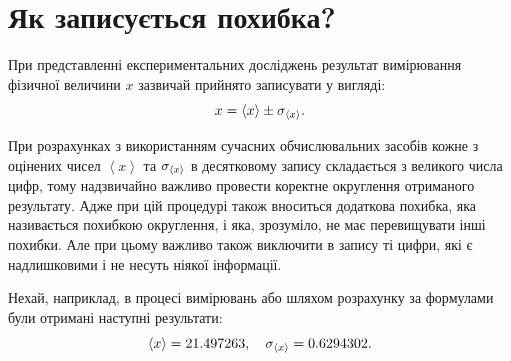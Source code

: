 \documentclass{LabBook}
\begin{document}

  \chapter{Як записується похибка?}


  При представленні експериментальних досліджень результат вимірювання фізичної величини $x$ зазвичай прийнято записувати у вигляді:
  \begin{equation}\label{eq:result}
    x = \left\langle x \right\rangle \pm \sigma_{\left\langle x \right\rangle}.
  \end{equation}

  При розрахунках з використанням сучасних обчислювальних засобів кожне з оцінених чисел $\left\langle x \right\rangle$ та $\sigma_{\left\langle x \right\rangle}$ в десятковому запису складається з великого числа цифр, тому надзвичайно важливо провести коректне округлення отриманого результату. Адже при цій процедурі також вноситься додаткова похибка, яка називається похибкою округлення, і яка, зрозуміло, не має перевищувати інші похибки. Але при цьому важливо також виключити в запису ті цифри, які є надлишковими і не несуть ніякої інформації.

  Нехай, наприклад, в процесі вимірювань або шляхом розрахунку за формулами були отримані наступні результати:
  \begin{equation*}
    \left\langle x \right\rangle = 21.497263, \quad \sigma_{\left\langle x \right\rangle} = 0.6294302.
  \end{equation*}
\end{document}
